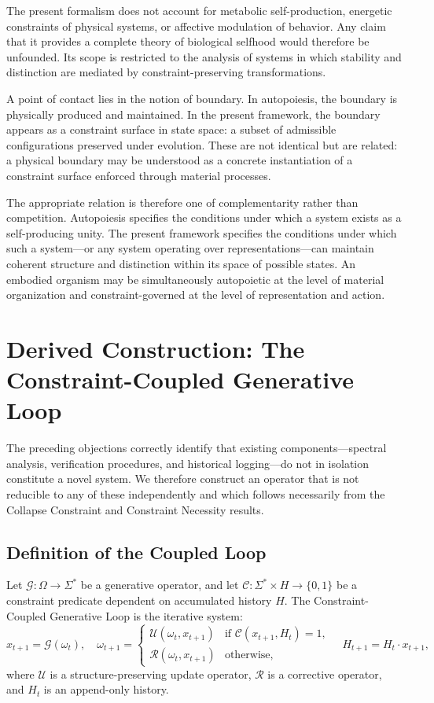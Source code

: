 \documentclass[12pt, a4paper]{article}
\theoremstyle{plain}
\theoremstyle{definition}
\theoremstyle{remark}
\begin{document}
The present formalism does not account for metabolic self-production, energetic constraints of physical systems, or affective modulation of behavior. Any claim that it provides a complete theory of biological selfhood would therefore be unfounded. Its scope is restricted to the analysis of systems in which stability and distinction are mediated by constraint-preserving transformations.

A point of contact lies in the notion of boundary. In autopoiesis, the boundary is physically produced and maintained. In the present framework, the boundary appears as a constraint surface in state space: a subset of admissible configurations preserved under evolution. These are not identical but are related: a physical boundary may be understood as a concrete instantiation of a constraint surface enforced through material processes.

The appropriate relation is therefore one of complementarity rather than competition. Autopoiesis specifies the conditions under which a system exists as a self-producing unity. The present framework specifies the conditions under which such a system---or any system operating over representations---can maintain coherent structure and distinction within its space of possible states. An embodied organism may be simultaneously autopoietic at the level of material organization and constraint-governed at the level of representation and action.

\section{Derived Construction: The Constraint-Coupled Generative Loop}

The preceding objections correctly identify that existing components---spectral analysis, verification procedures, and historical logging---do not in isolation constitute a novel system. We therefore construct an operator that is not reducible to any of these independently and which follows necessarily from the Collapse Constraint and Constraint Necessity results.

\subsection{Definition of the Coupled Loop}

Let $\mathcal{G} : \Omega \to \Sigma^*$ be a generative operator, and let $\mathcal{C} : \Sigma^* \times H \to \{0,1\}$ be a constraint predicate dependent on accumulated history $H$. The Constraint-Coupled Generative Loop is the iterative system:
\[
x_{t+1} = \mathcal{G}(\omega_t), \quad
\omega_{t+1} =
\begin{cases}
\mathcal{U}(\omega_t, x_{t+1}) & \text{if } \mathcal{C}(x_{t+1}, H_t) = 1, \\
\mathcal{R}(\omega_t, x_{t+1}) & \text{otherwise},
\end{cases}
\quad H_{t+1} = H_t \cdot x_{t+1},
\]
where $\mathcal{U}$ is a structure-preserving update operator, $\mathcal{R}$ is a corrective operator, and $H_t$ is an append-only history.
\end{document}
